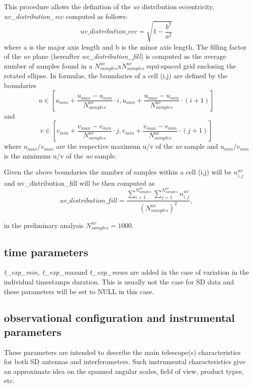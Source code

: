 \documentclass[11pt,a4paper]{ivoa}
\begin{document}
This procedure allows the definition of the \emph{uv} distribution eccentricity, \emph{uv\_distribution\_ecc} computed as follows:
\begin{equation}
uv\_distribution\_ecc = \sqrt{1-\frac{b^2}{a^2}}
\end{equation}
where a is the major axis length and b is the minor axis length.
The filling factor of the \emph{uv} plane (hereafter \emph{uv\_distribution\_fill}) is computed as the average
number of samples found in a $N^{uv}_{samples}$x$N^{uv}_{samples}$ equi-spaced grid enclosing the
rotated ellipse. In formulas, the boundaries of a cell (i,j) are defined by the boundaries
\begin{equation}
u \in [u_{min} + \frac{u_{max} - u_{min}}{N^{uv}_{samples}} \cdot i , u_{min} + \frac{u_{max} -
u_{min}}{N^{uv}_{samples}} \cdot (i + 1)]
\end{equation}
and
\begin{equation}
v \in [v_{min} + \frac{v_{max} - v_{min}}{N^{uv}_{samples}} \cdot j , v_{min} + \frac{v_{max} -
v_{min}}{N^{uv}_{samples}} \cdot (j + 1)]
\end{equation}
where $u_{max}$/$v_{max}$ are the respective maximum u/v of the \emph{uv} sample and
$u_{min}$/$v_{min}$ is the minimum u/v of the \emph{uv} sample.

Given the above boundaries the number of samples within a cell (i,j) will be $n^{uv}_{i,j}$
and uv\_distribution\_fill will be then computed as
\begin{equation}
uv\_distribution\_fill = \frac{\sum^{N^{uv}_{samples}}_{i=1} \sum^{N^{uv}_{samples}}_{j=1}
n^{uv}_{i,j} }{(N^{uv}_{samples}) ^ 2},
\end{equation}

in the preliminary analysis $N^{uv}_{samples} = 1000$.



\subsection{time parameters}
\emph{t\_exp\_min, t\_exp\_max}and \emph{t\_exp\_mean} are added in the case of variation in the individual timestamps 
duration. This is usually not the case for SD data and these parameters will be set to NULL in this case.

\subsection{observational configuration and instrumental parameters}
These parameters are intended to describe the main telescope(s) characteristics for both SD antennas and interferometers. 
Such instrumental characteristics give an approximate idea on the spanned angular scales, field of view, product types, etc.
\end{document}
